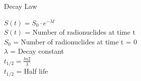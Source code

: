 
\begin{frame}{Decay Law}

    \begin{center}
        {\LARGE
            $S(t)=S_0 \cdot e^{-\lambda t}$\\
        }
        \bigskip
        $S(t)$ = Number of radionuclides at time t\\
        $S_0$ = Number of radionuclides at time t = 0\\
        $\lambda$ = Decay constant\\
        \bigskip\bigskip
        {\LARGE $t_{1/2} = \frac{ln 2}{\lambda}$ }\\
        \bigskip
        $t_{1/2}$ = Half life\\
    \end{center}
\end{frame}

